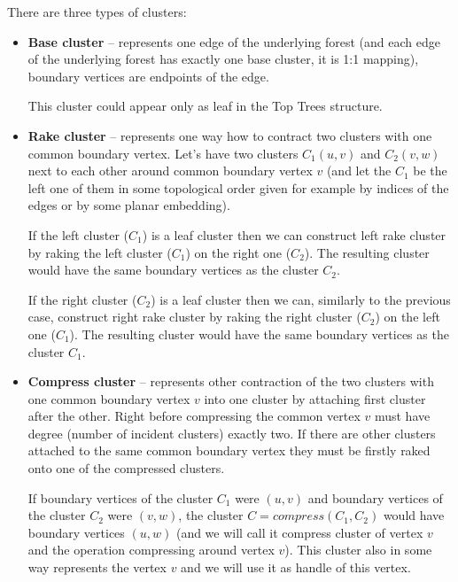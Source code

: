 There are three types of clusters:
\begin{itemize}

\item {\bf Base cluster} -- represents one edge of the underlying forest (and
each edge of the underlying forest has exactly one base cluster, it is 1:1 mapping),
boundary vertices are endpoints of the edge.

This cluster could appear only as leaf in the Top Trees structure.

\item {\bf Rake cluster} -- represents one way how to contract two clusters
with one common boundary vertex. Let's have two clusters $C_1(u,v)$ and
$C_2(v,w)$ next to each other around common boundary vertex $v$ (and let the
$C_1$ be the left one of them in some topological order given for example by
indices of the edges or by some planar embedding).

If the left cluster ($C_1$) is a leaf cluster then we can construct {\I left
rake cluster} by {\I raking} the left cluster ($C_1$) on the right one ($C_2$).
The resulting cluster would have the same boundary vertices as the cluster $C_2$.

If the right cluster ($C_2$) is a leaf cluster then we can, similarly to the
previous case, construct {\I right rake cluster} by {\I raking} the right
cluster ($C_2$) on the left one ($C_1$). The resulting cluster would have the
same boundary vertices as the cluster $C_1$.


\item{\bf Compress cluster} -- represents other contraction of the two clusters
with one common boundary vertex $v$ into one cluster by attaching first cluster
after the other. Right before compressing the common vertex $v$ must have degree
(number of incident clusters) exactly two. If there are other clusters attached
to the same common boundary vertex they must be firstly {\I raked} onto one of
the compressed clusters.

If boundary vertices of the cluster $C_1$ were $(u,v)$ and boundary vertices
of the cluster $C_2$ were $(v,w)$, the cluster $C=compress(C_1,C_2)$ would have
boundary vertices $(u,w)$ (and we will call it {\I compress cluster
of vertex $v$} and the operation {\I compressing around vertex $v$}).
This cluster also in some way represents the vertex $v$ and we will use it as
{\I handle} of this vertex.


\end{itemize}

